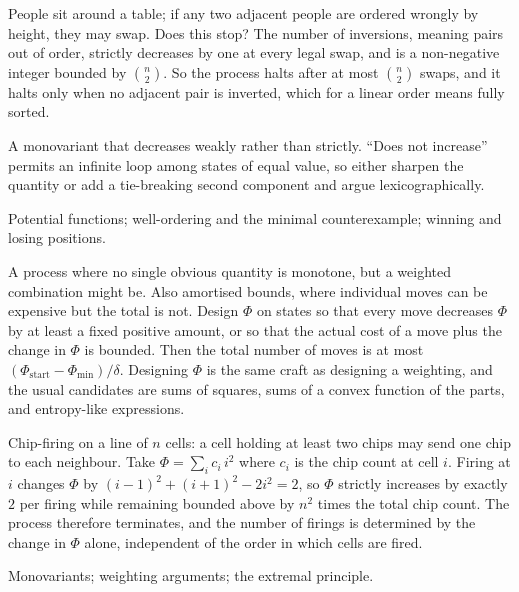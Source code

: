 \begin{worked}
People sit around a table; if any two adjacent people are ordered wrongly by height, they may swap. Does this stop? The number of inversions, meaning pairs out of order, strictly decreases by one at every legal swap, and is a non-negative integer bounded by $\binom{n}{2}$. So the process halts after at most $\binom{n}{2}$ swaps, and it halts only when no adjacent pair is inverted, which for a linear order means fully sorted.
\end{worked}

\begin{trap}
A monovariant that decreases weakly rather than strictly. ``Does not increase'' permits an infinite loop among states of equal value, so either sharpen the quantity or add a tie-breaking second component and argue lexicographically.
\end{trap}

\begin{seealsob}Potential functions; well-ordering and the minimal counterexample; winning and losing positions.\end{seealsob}

\cue A process where no single obvious quantity is monotone, but a weighted combination might be. Also amortised bounds, where individual moves can be expensive but the total is not.
\method Design $\Phi$ on states so that every move decreases $\Phi$ by at least a fixed positive amount, or so that the actual cost of a move plus the change in $\Phi$ is bounded. Then the total number of moves is at most $\left(\Phi_{\text{start}}-\Phi_{\min}\right)/\delta$. Designing $\Phi$ is the same craft as designing a weighting, and the usual candidates are sums of squares, sums of a convex function of the parts, and entropy-like expressions.

\begin{worked}
Chip-firing on a line of $n$ cells: a cell holding at least two chips may send one chip to each neighbour. Take $\Phi=\sum_{i}c_{i}\,i^{2}$ where $c_{i}$ is the chip count at cell $i$. Firing at $i$ changes $\Phi$ by $(i-1)^{2}+(i+1)^{2}-2i^{2}=2$, so $\Phi$ strictly increases by exactly $2$ per firing while remaining bounded above by $n^{2}$ times the total chip count. The process therefore terminates, and the number of firings is determined by the change in $\Phi$ alone, independent of the order in which cells are fired.
\end{worked}

\begin{seealsob}Monovariants; weighting arguments; the extremal principle.\end{seealsob}

